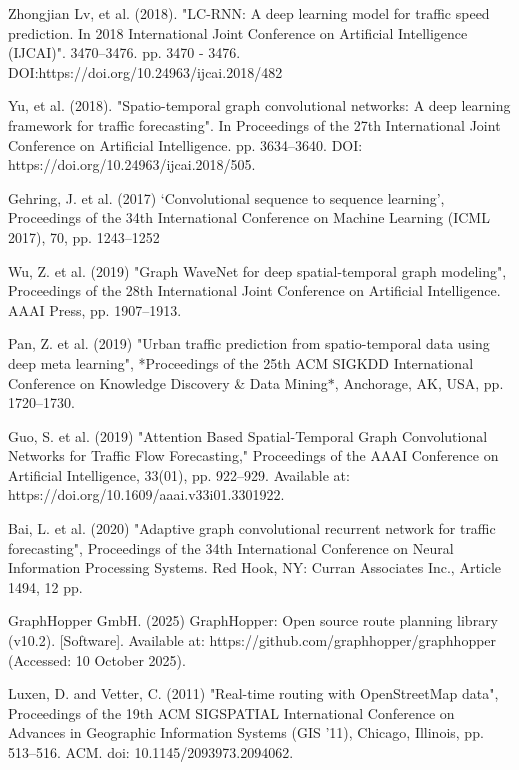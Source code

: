\begin{thebibliography}{99}
        Zhongjian Lv, et al. (2018). "LC-RNN: A deep learning model for traffic speed prediction. In 2018 International Joint Conference on Artificial Intelligence (IJCAI)". 3470–3476.
        pp. 3470 - 3476. DOI:https://doi.org/10.24963/ijcai.2018/482


        Yu, et al. (2018). "Spatio-temporal graph convolutional networks: A deep learning framework for traffic forecasting". In Proceedings of the 27th International Joint Conference on Artificial Intelligence. pp. 3634–3640. DOI: https://doi.org/10.24963/ijcai.2018/505.

        Gehring, J. et al. (2017) ‘Convolutional sequence to sequence learning’, Proceedings of the 34th International Conference on Machine Learning (ICML 2017), 70, pp. 1243–1252

        Wu, Z. et al. (2019) "Graph WaveNet for deep spatial-temporal graph modeling", Proceedings of the 28th International Joint Conference on Artificial Intelligence. AAAI Press, pp. 1907–1913.

        Pan, Z. et al. (2019) "Urban traffic prediction from spatio-temporal data using deep meta learning", *Proceedings of the 25th ACM SIGKDD International Conference on Knowledge Discovery \& Data Mining$*$, Anchorage, AK, USA, pp. 1720–1730.


        Guo, S. et al. (2019) "Attention Based Spatial-Temporal Graph Convolutional Networks for Traffic Flow Forecasting," Proceedings of the AAAI Conference on Artificial Intelligence, 33(01), pp. 922–929. Available at: https://doi.org/10.1609/aaai.v33i01.3301922.

        Bai, L. et al. (2020) "Adaptive graph convolutional recurrent network for traffic forecasting", Proceedings of the 34th International Conference on Neural Information Processing Systems. Red Hook, NY: Curran Associates Inc., Article 1494, 12 pp.

        GraphHopper GmbH. (2025) GraphHopper: Open source route planning library (v10.2). [Software]. Available at: https://github.com/graphhopper/graphhopper (Accessed: 10 October 2025).

        Luxen, D. and Vetter, C. (2011) "Real-time routing with OpenStreetMap data", Proceedings of the 19th ACM SIGSPATIAL International Conference on Advances in Geographic Information Systems (GIS '11), Chicago, Illinois, pp. 513–516. ACM. doi: 10.1145/2093973.2094062.


\end{thebibliography}
